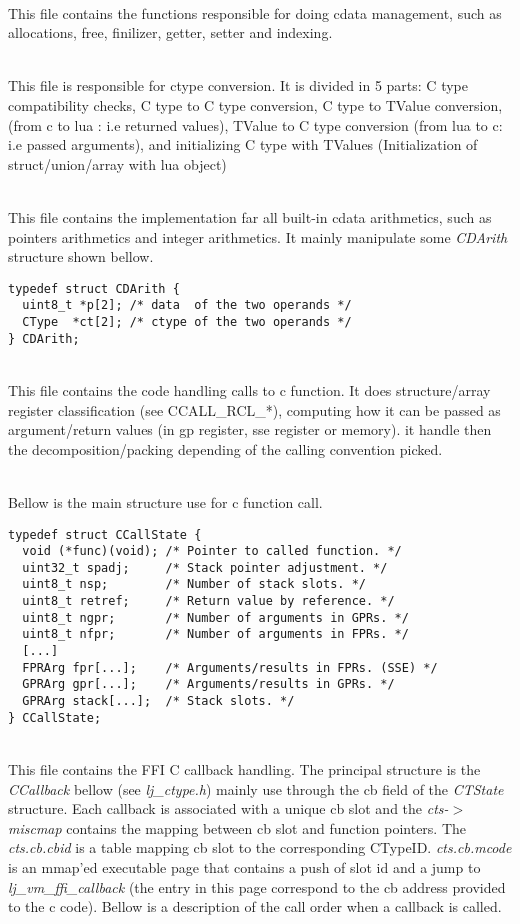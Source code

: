 \\
This file contains the functions responsible for doing cdata management, such as
allocations, free, finilizer, getter, setter and indexing.

\\
This file is responsible for ctype conversion. It is divided in 5 parts: C type
compatibility checks, C type to C type conversion, C type to TValue conversion,
(from c to lua : i.e returned values), TValue to C type conversion (from lua to
c: i.e passed arguments), and initializing C type with TValues (Initialization
of struct/union/array with lua object)

\\%
This file contains the implementation far all built-in cdata arithmetics, such
as pointers arithmetics and integer arithmetics. It mainly manipulate some
\emph{CDArith} structure shown bellow.
\begin{lstlisting}[style=CStyle]
typedef struct CDArith {
  uint8_t *p[2]; /* data  of the two operands */
  CType  *ct[2]; /* ctype of the two operands */
} CDArith;
\end{lstlisting}

\\
This file contains the code handling calls to c function. It does structure/array
register classification (see CCALL\_RCL\_*), computing how it can be passed
as argument/return values (in gp register, sse register or memory). it handle
then the decomposition/packing depending of the calling convention picked.

\\
Bellow is the main structure use for c function call.
\begin{lstlisting}[style=CStyle]
typedef struct CCallState {
  void (*func)(void); /* Pointer to called function. */
  uint32_t spadj;     /* Stack pointer adjustment. */
  uint8_t nsp;        /* Number of stack slots. */
  uint8_t retref;     /* Return value by reference. */
  uint8_t ngpr;       /* Number of arguments in GPRs. */
  uint8_t nfpr;       /* Number of arguments in FPRs. */
  [...]
  FPRArg fpr[...];    /* Arguments/results in FPRs. (SSE) */
  GPRArg gpr[...];    /* Arguments/results in GPRs. */
  GPRArg stack[...];  /* Stack slots. */
} CCallState;
\end{lstlisting}

\\
This file contains the FFI C callback handling. The principal structure is the
\emph{CCallback} bellow (see \emph{lj\_ctype.h}) mainly use through the cb field of the \emph{CTState}
structure. Each callback is associated with a unique cb slot and the
\emph{cts-$>$miscmap} contains the mapping between cb slot and function
pointers. The \emph{cts.cb.cbid} is a table mapping cb slot to the corresponding
CTypeID. \emph{cts.cb.mcode} is an mmap'ed executable page that contains a push
of slot id and a jump to \emph{lj\_vm\_ffi\_callback} (the entry in this page
correspond to the cb address provided to the c code). Bellow is a description
of the call order when a callback is called.

